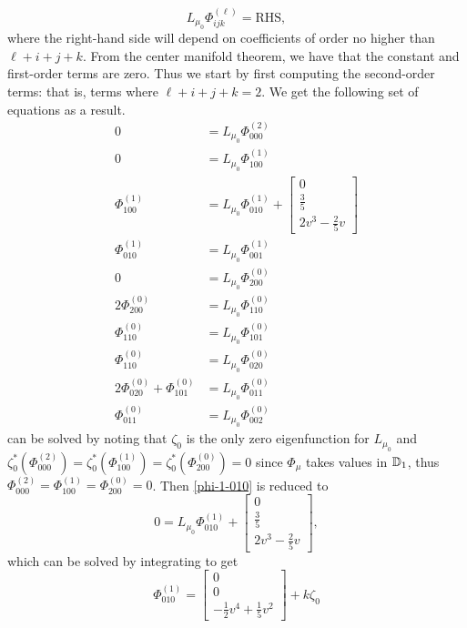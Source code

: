 \begin{equation}
	L_{\mu_0} \Phi^{(\ell)}_{ijk} = \mathrm{RHS},
\end{equation}
where the right-hand side will depend on coefficients of order no higher than \(\ell + i + j + k\). From the center manifold theorem, we have that the constant and first-order terms are zero. Thus we start by first computing the second-order terms: that is, terms where \(\ell + i + j + k = 2\). We get the following set of equations as a result.
\begin{align}
	0 &= L_{\mu_0} \Phi^{(2)}_{000} \label{phi-2-000}\\ 
	0 & = L_{\mu_0} \Phi^{(1)}_{100} \label{phi-1-100} \\
	\Phi^{(1)}_{100}  & = L_{\mu_0} \Phi^{(1)}_{010} + \begin{bmatrix} 0 \\ \frac 35 \\ 2v^3 - \frac 2 5 v \end{bmatrix} \label{phi-1-010} \\
	\Phi^{(1)}_{010}  & = L_{\mu_0} \Phi^{(1)}_{001} \label{phi-1-001} \\
	0 & = L_{\mu_0} \Phi^{(0)}_{200} \label{phi-0-200}\\
	2\Phi^{(0)}_{200}  & = L_{\mu_0} \Phi^{(0)}_{110} \\ 
		\Phi^{(0)}_{110}  & = L_{\mu_0} \Phi^{(0)}_{101} \\
	\Phi^{(0)}_{110}  & = L_{\mu_0} \Phi^{(0)}_{020} \\
	2\Phi^{(0)}_{020}  + \Phi^{(0)}_{101} & = L_{\mu_0} \Phi^{(0)}_{011} \\
	\Phi^{(0)}_{011}  & = L_{\mu_0} \Phi^{(0)}_{002} 
\end{align}
 can be solved by noting that \(\zeta_0\) is the only zero eigenfunction for \(L_{\mu_0}\) and \(\zeta_0^*(\Phi_{000}^{(2) }) = \zeta_0^*(\Phi_{100}^{(1)}) = \zeta_0^*(\Phi_{200}^{(0)}) = 0\) since \(\Phi_\mu\) takes values in \(\mathbb{D}_1\), thus \(\Phi_{000}^{(2)} = \Phi_{100}^{(1)} =\Phi_{200}^{(0)} = 0\). Then \cref{phi-1-010} is reduced to 
\begin{equation}
	0 =  L_{\mu_0} \Phi^{(1)}_{010} + \begin{bmatrix} 0 \\ \frac 35 \\ 2v^3 - \frac 2 5 v \end{bmatrix},
\end{equation}
which can be solved by integrating to get 
\begin{equation}
	\Phi_{010}^{(1)} = \begin{bmatrix}
		0 \\ 0 \\ - \frac 1 2 v^4 + \frac 1 5 v^2
	\end{bmatrix} + k  \zeta_0
\end{equation}
